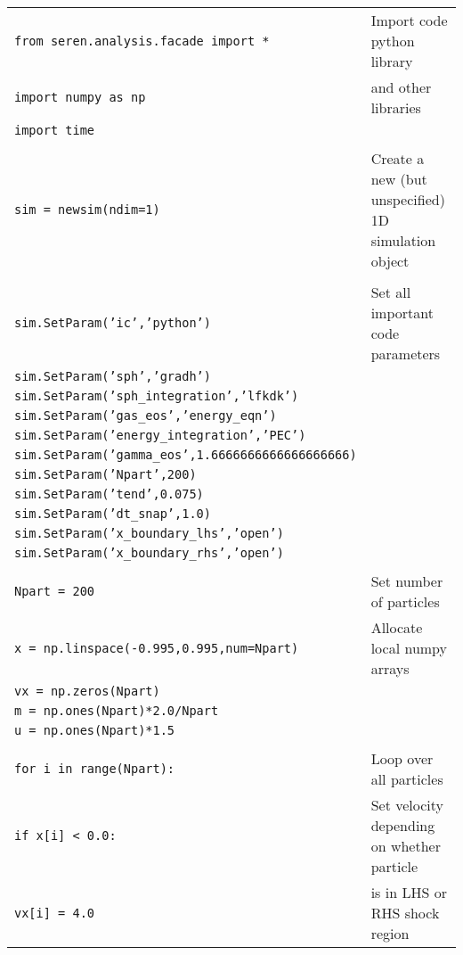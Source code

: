 \documentclass[a4paper]{article}
\newcommand{\var}[1]{\texttt{#1}}
\begin{document}
\begin{tabular}{p{9cm}p{6.0cm}}
\var{from seren.analysis.facade import *}  & Import code python library \\
\var{import numpy as np}                   & and other libraries \\
\var{import time}                          & \\
& \\
\var{sim = newsim(ndim=1)}                 & Create a new (but unspecified) 1D simulation object \\
& \\                                       
\var{sim.SetParam('ic','python')}          & Set all important code parameters   \\
\var{sim.SetParam('sph','gradh')}          & \\
\var{sim.SetParam('sph\_integration','lfkdk')} &\\
\var{sim.SetParam('gas\_eos','energy\_eqn')} & \\
\var{sim.SetParam('energy\_integration','PEC')} & \\
\var{sim.SetParam('gamma\_eos',1.6666666666666666666)} & \\
\var{sim.SetParam('Npart',200)} & \\
\var{sim.SetParam('tend',0.075)} & \\
\var{sim.SetParam('dt\_snap',1.0)} & \\
\var{sim.SetParam('x\_boundary\_lhs','open')} & \\
\var{sim.SetParam('x\_boundary\_rhs','open')} & \\
& \\                      
\var{Npart = 200} &  Set number of particles \\
\var{x = np.linspace(-0.995,0.995,num=Npart)} & Allocate local numpy arrays \\
\var{vx = np.zeros(Npart)}  & \\
\var{m = np.ones(Npart)*2.0/Npart} & \\
\var{u = np.ones(Npart)*1.5} & \\
& \\          
\var{for i in range(Npart):}   & Loop over all particles \\
\hspace{0.5cm}\var{if x[i] < 0.0:}   & Set velocity depending on whether particle \\
\hspace{1cm}\var{vx[i] = 4.0}   & is in LHS or RHS shock region \\

\end{tabular}
\end{document}
